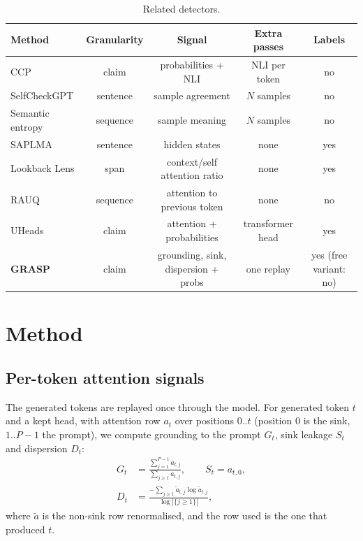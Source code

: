 \documentclass[11pt]{article}
\begin{document}
\begin{table}[t]
\centering\small
\begin{tabular}{lcccc}
\toprule
Method & Granularity & Signal & Extra passes & Labels \\
\midrule
CCP \citep{fadeeva-etal-2024-fact} & claim & probabilities + NLI & NLI per token & no \\
SelfCheckGPT \citep{manakul-etal-2023-selfcheckgpt} & sentence & sample agreement & $N$ samples & no \\
Semantic entropy \citep{kuhn2023semanticuncertaintylinguisticinvariances} & sequence & sample meaning & $N$ samples & no \\
SAPLMA \citep{azaria2023internalstatellmknows} & sentence & hidden states & none & yes \\
Lookback Lens \citep{chuang2024lookbacklensdetectingmitigating} & span & context/self attention ratio & none & yes \\
RAUQ \citep{vazhentsev2026efficienthallucinationdetectionllms} & sequence & attention to previous token & none & no \\
UHeads \citep{shelmanov-etal-2025-head} & claim & attention + probabilities & transformer head & yes \\
\textbf{GRASP} & claim & grounding, sink, dispersion + probs & one replay & yes (free variant: no) \\
\bottomrule
\end{tabular}
\caption{Related detectors.}
\label{tab:related}
\end{table}

\section{Method}
\subsection{Per-token attention signals}
The generated tokens are replayed once through the model. For generated token $t$ and a kept head,
with attention row $a_t$ over positions $0..t$ (position 0 is the sink, $1..P{-}1$ the prompt),
we compute grounding to the prompt $G_t$, sink leakage $S_t$ and dispersion $D_t$:
\begin{align}
G_t &= \frac{\sum_{j=1}^{P-1} a_{t,j}}{\sum_{j\ge 1} a_{t,j}}, \qquad S_t = a_{t,0},\\
D_t &= \frac{-\sum_{j\ge1} \tilde a_{t,j}\log \tilde a_{t,j}}{\log |\{j\ge1\}|},
\end{align}
where $\tilde a$ is the non-sink row renormalised, and the row used is the one that produced $t$.
\end{document}
